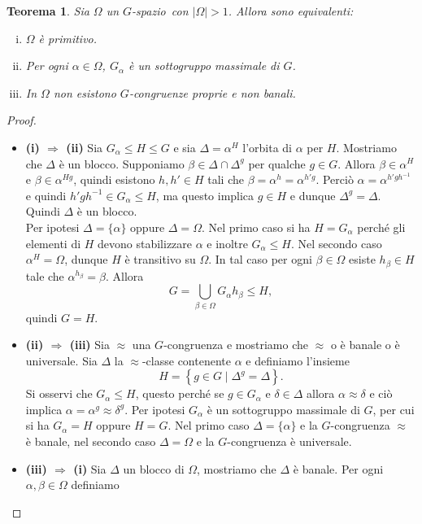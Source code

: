 \documentclass[12pt,a4paper,openright]{report}
\newcommand{\0}{\setminus\{0\}} %
\newcommand{\Gsp}{$G$-spazio~} %
\newcommand{\stab}[1]{G_{#1}}   %
\theoremstyle{definition}
\theoremstyle{plain}
\newtheorem{theo}[defn]{Teorema}
\begin{document}
\begin{theo}
    Sia $\Omega$ un \Gsp con $|\Omega|>1$. Allora sono equivalenti:
    \begin{enumerate}[(i)]
        \item $\Omega$ è primitivo.
        \item Per ogni $\alpha \in \Omega$, $\stab{\alpha}$ è un sottogruppo massimale di $G$.
        \item In $\Omega$ non esistono $G$-congruenze proprie e non banali.
    \end{enumerate}
\end{theo}
\begin{proof} 
    $ $
\begin{itemize}
    \item[]\textbf{(i) $\Rightarrow$ (ii)} Sia $\stab{\alpha}\leq H \leq G$ e sia $\Delta=\alpha^H$ l'orbita di $\alpha$ per $H$. Mostriamo che $\Delta$ è un blocco. Supponiamo $\beta \in \Delta \cap \Delta^g$ per qualche $g \in G$. Allora $\beta \in \alpha^{H}$ e $\beta \in \alpha^{Hg}$, quindi esistono $h,h' \in H$ tali che $\beta=\alpha^h=\alpha^{h'g}$.
    Perciò $\alpha=\alpha^{h'gh^{-1}}$ e quindi $h'gh^{-1} \in \stab{\alpha} \leq H$, ma questo implica $g \in H$ e dunque $\Delta^g=\Delta$. Quindi $\Delta$ è un blocco. \\
    Per ipotesi $\Delta=\{\alpha\}$ oppure $\Delta=\Omega$. Nel primo caso si ha $H=\stab{\alpha}$ perché gli elementi di $H$ devono stabilizzare $\alpha$ e inoltre $\stab{\alpha} \leq H$. Nel secondo caso $\alpha^H=\Omega$, dunque $H$ è transitivo su $\Omega$. In tal caso per ogni $\beta \in \Omega$ esiste $h_{\beta} \in H$ tale che $\alpha^{h_{\beta}}=\beta$. Allora
    \[G= \bigcup_{\beta \in \Omega}\stab{\alpha}h_{\beta} \leq H,\]
    quindi $G=H$.
    \item[]\textbf{(ii) $\Rightarrow$ (iii)} Sia $\approx$ una $G$-congruenza e mostriamo che $\approx$ o è banale o è universale.
    Sia $\Delta$ la $\approx$-classe contenente $\alpha$ e definiamo l'insieme
    \[H=\left\{g \in G \mid \Delta^g=\Delta \right\}.\] 
    Si osservi che $\stab{\alpha}\leq H$, questo perché se $g \in \stab{\alpha}$ e $\delta \in \Delta$ allora $\alpha \approx \delta$ e ciò implica $\alpha=\alpha^g \approx \delta^g$. Per ipotesi $\stab{\alpha}$ è un sottogruppo massimale di $G$, per cui si ha $\stab{\alpha}=H$ oppure $H=G$. Nel primo caso $\Delta=\{\alpha\}$ e la $G$-congruenza $\approx$ è banale, nel secondo caso $\Delta=\Omega$ e la $G$-congruenza è universale.
    \item[]\textbf{(iii) $\Rightarrow$ (i)} Sia $\Delta$ un blocco di $\Omega$, mostriamo che $\Delta$ è banale. Per ogni $\alpha, \beta \in \Omega$ definiamo

\end{itemize}
\end{proof}
\end{document}

